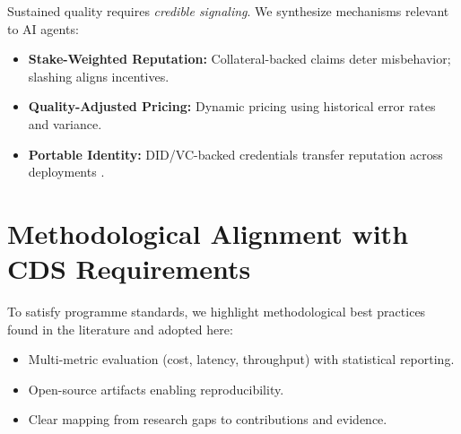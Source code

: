 Sustained quality requires \emph{credible signaling}. We synthesize mechanisms relevant to AI agents:
\begin{itemize}
    \item \textbf{Stake-Weighted Reputation:} Collateral-backed claims deter misbehavior; slashing aligns incentives.
    \item \textbf{Quality-Adjusted Pricing:} Dynamic pricing using historical error rates and variance.
    \item \textbf{Portable Identity:} DID/VC-backed credentials transfer reputation across deployments \citep{w3c-did-v1,w3c-vc-2}.
\end{itemize}

\section{Methodological Alignment with CDS Requirements}

To satisfy programme standards, we highlight methodological best practices found in the literature and adopted here:
\begin{itemize}
    \item Multi-metric evaluation (cost, latency, throughput) with statistical reporting.
    \item Open-source artifacts enabling reproducibility.
    \item Clear mapping from research gaps to contributions and evidence.
\end{itemize}
